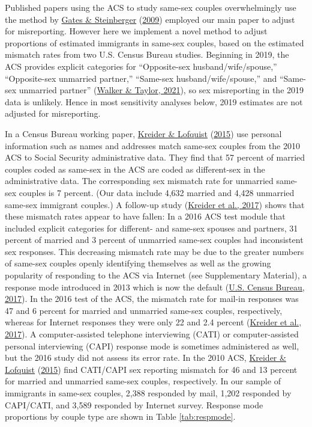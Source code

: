 \documentclass[
  11pt,
]{article}
\begin{document}
Published papers using the ACS to study same-sex couples overwhelmingly use the method by \protect\hyperlink{ref-gates_2009}{Gates \& Steinberger} (\protect\hyperlink{ref-gates_2009}{2009}) employed our main paper to adjust for misreporting. However here we implement a novel method to adjust proportions of estimated immigrants in same-sex couples, based on the estimated mismatch rates from two U.S. Census Bureau studies. Beginning in 2019, the ACS provides explicit categories for ``Opposite-sex husband/wife/spouse,'' ``Opposite-sex unmarried partner,'' ``Same-sex husband/wife/spouse,'' and ``Same-sex unmarried partner'' (\protect\hyperlink{ref-walker_2021}{Walker \& Taylor, 2021}), so sex misreporting in the 2019 data is unlikely. Hence in most sensitivity analyses below, 2019 estimates are not adjusted for misreporting.

In a Census Bureau working paper, \protect\hyperlink{ref-kreider_2015}{Kreider \& Lofquist} (\protect\hyperlink{ref-kreider_2015}{2015}) use personal information such as names and addresses match same-sex couples from the 2010 ACS to Social Security administrative data. They find that 57 percent of married couples coded as same-sex in the ACS are coded as different-sex in the administrative data. The corresponding sex mismatch rate for unmarried same-sex couples is 7 percent. (Our data include 4,632 married and 4,428 unmarried same-sex immigrant couples.) A follow-up study (\protect\hyperlink{ref-kreider_2017}{Kreider et al., 2017}) shows that these mismatch rates appear to have fallen: In a 2016 ACS test module that included explicit categories for different- and same-sex spouses and partners, 31 percent of married and 3 percent of unmarried same-sex couples had inconsistent sex responses. This decreasing mismatch rate may be due to the greater numbers of same-sex couples openly identifying themselves as well as the growing popularity of responding to the ACS via Internet (see Supplementary Material), a response mode introduced in 2013 which is now the default (\protect\hyperlink{ref-u.s.censusbureau_2017}{U.S. Census Bureau, 2017}). In the 2016 test of the ACS, the mismatch rate for mail-in responses was 47 and 6 percent for married and unmarried same-sex couples, respectively, whereas for Internet responses they were only 22 and 2.4 percent (\protect\hyperlink{ref-kreider_2017}{Kreider et al., 2017}). A computer-assisted telephone interviewing (CATI) or computer-assisted personal interviewing (CAPI) response mode is sometimes administered as well, but the 2016 study did not assess its error rate. In the 2010 ACS, \protect\hyperlink{ref-kreider_2015}{Kreider \& Lofquist} (\protect\hyperlink{ref-kreider_2015}{2015}) find CATI/CAPI sex reporting mismatch for 46 and 13 percent for married and unmarried same-sex couples, respectively. In our sample of immigrants in same-sex couples, 2,388 responded by mail, 1,202 responded by CAPI/CATI, and 3,589 responded by Internet survey. Response mode proportions by couple type are shown in Table \ref{tab:respmode}.
\end{document}
